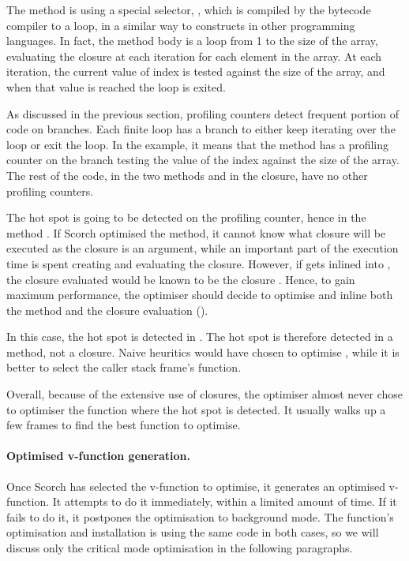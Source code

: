 \documentclass[a4paper,12pt,twoside]{../includes/ThesisStyle}
\begin{document}
The method  is using a special selector, , which is compiled by the bytecode compiler to a loop, in a similar way to  constructs in other programming languages. In fact, the  method body is a loop from 1 to the size of the array, evaluating the closure at each iteration for each element in the array. At each iteration, the current value of index is tested against the size of the array, and when that value is reached the loop is exited.

As discussed in the previous section, profiling counters detect frequent portion of code on branches. Each finite loop has a branch to either keep iterating over the loop or exit the loop. In the example, it means that the method  has a profiling counter on the branch testing the value of the index against the size of the array. The rest of the code, in the two methods and in the closure, have no other profiling counters.

The hot spot is going to be detected on the profiling counter, hence in the method . If Scorch optimised the  method, it cannot know what closure will be executed as the closure is an argument, while an important part of the execution time is spent creating and evaluating the closure. However, if  gets inlined into , the closure evaluated would be known to be the closure . Hence, to gain maximum performance, the optimiser should decide to optimise  and inline both the  method and the closure evaluation (). 

In this case, the hot spot is detected in . The hot spot is therefore detected in a method, not a closure. Naive heuritics would have chosen to optimise , while it is better to select the caller stack frame's function.

Overall, because of the extensive use of closures, the optimiser almost never chose to optimiser the function where the hot spot is detected. It usually walks up a few frames to find the best function to optimise. 

\paragraph{Optimised v-function generation.}
Once Scorch has selected the v-function to optimise, it generates an optimised v-function. It attempts to do it immediately, within a limited amount of time. If it fails to do it, it postpones the optimisation to background mode. The function's optimisation and installation is using the same code in both cases, so we will discuss only the critical mode optimisation in the following paragraphs.
\end{document}
